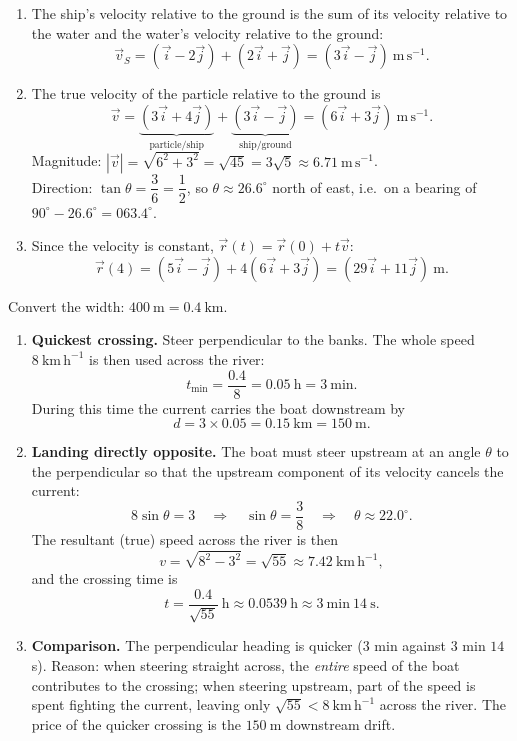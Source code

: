 \documentclass[11pt]{article}
\begin{document}
\begin{corrige}
\begin{enumerate}
\item The ship's velocity relative to the ground is the sum of its velocity relative to the water and the water's velocity relative to the ground:
\[
\vec{v}_{S} = (\vec{i} - 2\vec{j}) + (2\vec{i} + \vec{j}) = (3\vec{i} - \vec{j})\ \mathrm{m\,s^{-1}}.
\]
\item The true velocity of the particle relative to the ground is
\[
\vec{v} = \underbrace{(3\vec{i} + 4\vec{j})}_{\text{particle/ship}} + \underbrace{(3\vec{i} - \vec{j})}_{\text{ship/ground}} = (6\vec{i} + 3\vec{j})\ \mathrm{m\,s^{-1}}.
\]
Magnitude: $|\vec{v}| = \sqrt{6^2 + 3^2} = \sqrt{45} = 3\sqrt{5} \approx 6.71\ \mathrm{m\,s^{-1}}$.\\
Direction: $\tan\theta = \dfrac{3}{6} = \dfrac{1}{2}$, so $\theta \approx 26.6^{\circ}$ north of east, i.e.\ on a bearing of $90^{\circ} - 26.6^{\circ} = 063.4^{\circ}$.
\item Since the velocity is constant, $\vec{r}(t) = \vec{r}(0) + t\vec{v}$:
\[
\vec{r}(4) = (5\vec{i} - \vec{j}) + 4(6\vec{i} + 3\vec{j}) = (29\vec{i} + 11\vec{j})\ \mathrm{m}.
\]
\end{enumerate}
\end{corrige}

\begin{corrige}
Convert the width: $400\ \mathrm{m} = 0.4\ \mathrm{km}$.
\begin{enumerate}
\item \textbf{Quickest crossing.} Steer perpendicular to the banks. The whole speed $8\ \mathrm{km\,h^{-1}}$ is then used across the river:
\[
t_{\min} = \frac{0.4}{8} = 0.05\ \mathrm{h} = 3\ \mathrm{min}.
\]
During this time the current carries the boat downstream by
\[
d = 3 \times 0.05 = 0.15\ \mathrm{km} = 150\ \mathrm{m}.
\]
\item \textbf{Landing directly opposite.} The boat must steer upstream at an angle $\theta$ to the perpendicular so that the upstream component of its velocity cancels the current:
\[
8\sin\theta = 3 \quad\Longrightarrow\quad \sin\theta = \frac{3}{8} \quad\Longrightarrow\quad \theta \approx 22.0^{\circ}.
\]
The resultant (true) speed across the river is then
\[
v = \sqrt{8^2 - 3^2} = \sqrt{55} \approx 7.42\ \mathrm{km\,h^{-1}},
\]
and the crossing time is
\[
t = \frac{0.4}{\sqrt{55}}\ \mathrm{h} \approx 0.0539\ \mathrm{h} \approx 3\ \mathrm{min}\ 14\ \mathrm{s}.
\]
\item \textbf{Comparison.} The perpendicular heading is quicker ($3$ min against $3$ min $14$ s). Reason: when steering straight across, the \emph{entire} speed of the boat contributes to the crossing; when steering upstream, part of the speed is spent fighting the current, leaving only $\sqrt{55} < 8\ \mathrm{km\,h^{-1}}$ across the river. The price of the quicker crossing is the $150\ \mathrm{m}$ downstream drift.
\end{enumerate}
\end{corrige}
\end{document}
